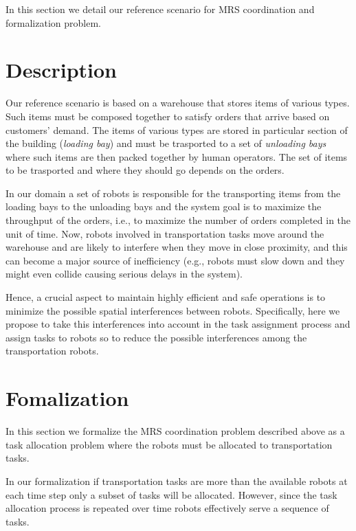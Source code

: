 In this section we detail our reference scenario for MRS coordination and formalization problem.

\section{Description}
Our reference scenario is based on a warehouse that stores items of various types.
Such items must be composed together to satisfy orders that arrive based on customers’ demand.
The items of various types are stored in particular section of the building (\textit{loading bay})
and must be trasported to a set of \textit{unloading bays} where such items are then 
packed together by human operators. The set of items to be trasported and where they should
go depends on the orders.

In our domain a set of robots is responsible for the transporting items from
the loading bays to the unloading bays and the system goal is to maximize the
throughput of the orders, i.e., to maximize the number of orders completed in
the unit of time. Now, robots involved in transportation tasks move around
the warehouse and are likely to interfere when they move in close proximity,
and this can become a major source of inefficiency (e.g., robots must slow down
and they might even collide causing serious delays in the system).

Hence, a crucial aspect to maintain highly efficient and safe operations is to minimize the
possible spatial interferences between robots. Specifically, here we propose to
take this interferences into account in the task assignment process and assign
tasks to robots so to reduce the possible interferences among the transportation
robots.


\section{Fomalization}
In this section we formalize the MRS coordination problem described above as a task allocation problem
where the robots must be allocated to transportation tasks. 

In our formalization if transportation tasks are more than the available robots at each time step only a subset 
of tasks will be allocated. However, since the task allocation process is repeated over time robots 
effectively serve a sequence of tasks. 

